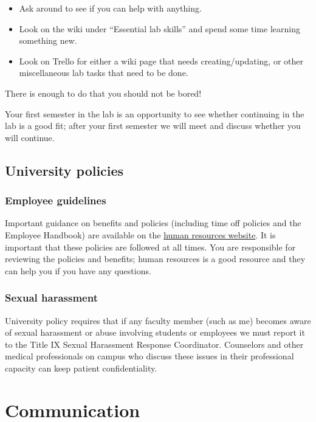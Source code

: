 \documentclass[letterpaper,12pt,oneside]{memoir}
\begin{document}
\begin{itemize}
\item Ask around to see if you can help with anything.
\item Look on the wiki under ``Essential lab skills'' and spend some time learning something new.
\item Look on Trello for either a wiki page that needs creating/updating, or other miscellaneous lab tasks that need to be done.
\end{itemize}

There is enough to do that you should not be bored!

Your first semester in the lab is an opportunity to see whether continuing in the lab is a good fit; after your first semester we will meet and discuss whether you will continue.

\section{University policies}

\subsection{Employee guidelines}
Important guidance on benefits and policies (including time off policies and the Employee Handbook) are available on the \href{https://www.temple.edu/faculty-and-staff/working-temple/human-resources}{human resources website}. It is important that these policies are followed at all times. You are responsible for reviewing the policies and benefits; human resources is a good resource and they can help you if you have any questions.

\subsection{Sexual harassment}
University policy requires that if any faculty member (such as me) becomes aware of sexual harassment or abuse involving students or employees we must report it to the Title IX Sexual Harassment Response Coordinator. Counselors and other medical professionals on campus who discuss these issues in their professional capacity can keep patient confidentiality.



\chapter{Communication}
\end{document}
